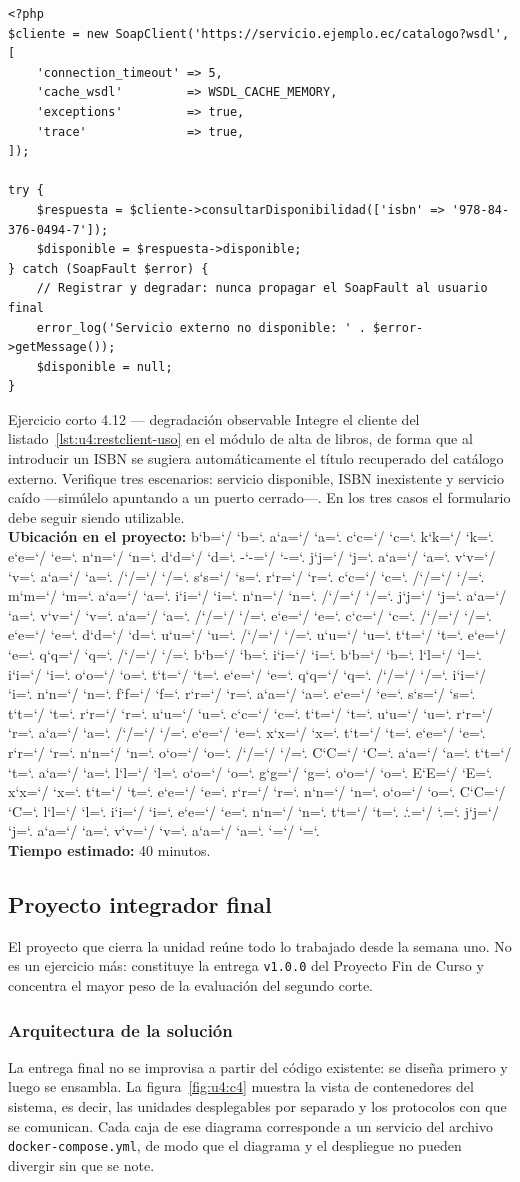 \documentclass[11pt,a4paper,openany]{book}
\newcommand{\ruta}[1]{{\ttfamily\small\rutaaux #1\relax}}
\def\rutaaux{\futurelet\next\rutapaso}
\def\rutapaso{%
	\ifx\next\relax \let\sig\relax
	\else \let\sig\rutaimprime \fi \sig}
\def\rutaimprime#1{%
	#1\ifnum`#1=`/ \allowbreak\fi
	\ifnum`#1=`. \allowbreak\fi
	\rutaaux}
\begin{document}
\begin{lstlisting}[style=php,caption={Consumo de un servicio SOAP desde PHP con la clase estandar.},label={lst:u4:soapclient}]
<?php
$cliente = new SoapClient('https://servicio.ejemplo.ec/catalogo?wsdl', [
	'connection_timeout' => 5,
	'cache_wsdl'         => WSDL_CACHE_MEMORY,
	'exceptions'         => true,
	'trace'              => true,
]);

try {
	$respuesta = $cliente->consultarDisponibilidad(['isbn' => '978-84-376-0494-7']);
	$disponible = $respuesta->disponible;
} catch (SoapFault $error) {
	// Registrar y degradar: nunca propagar el SoapFault al usuario final
	error_log('Servicio externo no disponible: ' . $error->getMessage());
	$disponible = null;
}
\end{lstlisting}

\begin{cajaejercicio}{Ejercicio corto 4.12 --- degradación observable}
	Integre el cliente del listado~\ref{lst:u4:restclient-uso} en el módulo de alta de libros, de forma que al introducir un ISBN se sugiera automáticamente el título recuperado del catálogo externo. Verifique tres escenarios: servicio disponible, ISBN inexistente y servicio caído ---simúlelo apuntando a un puerto cerrado---. En los tres casos el formulario debe seguir siendo utilizable.\\[3pt]
	\textbf{Ubicación en el proyecto:} \ruta{backend-java/src/main/java/ec/edu/uteq/biblioteq/infraestructura/externo/CatalogoExternoClient.java}\\[3pt]
	\textbf{Tiempo estimado:} 40 minutos.
\end{cajaejercicio}

\subsection{Proyecto integrador final}
\label{sec:u4:proyecto-final}

El proyecto que cierra la unidad reúne todo lo trabajado desde la semana uno. No es un ejercicio más: constituye la entrega \texttt{v1.0.0} del Proyecto Fin de Curso y concentra el mayor peso de la evaluación del segundo corte.


\subsubsection{Arquitectura de la solución}

La entrega final no se improvisa a partir del código existente: se diseña primero y luego se ensambla. La figura~\ref{fig:u4:c4} muestra la vista de contenedores del sistema, es decir, las unidades desplegables por separado y los protocolos con que se comunican. Cada caja de ese diagrama corresponde a un servicio del archivo \texttt{docker-compose.yml}, de modo que el diagrama y el despliegue no pueden divergir sin que se note.
\end{document}
